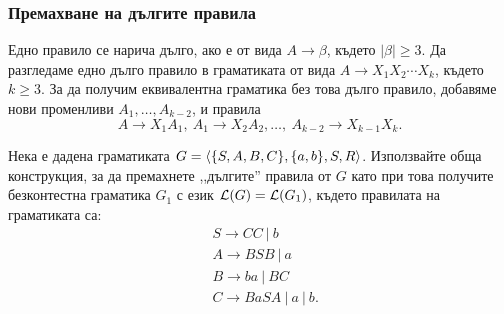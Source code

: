 \subsubsection*{Премахване на дългите правила}

Едно правило се нарича дълго, ако е от вида $A \to \beta$, където $|\beta| \geq 3$.
Да разгледаме едно дълго правило в граматиката от вида $A \to X_1X_2\cdots X_k$, 
където $k \geq 3$. За да получим еквивалентна граматика без това дълго правило,
добавяме нови променливи $A_1,\dots, A_{k-2}$, и правила
\[A \to X_1A_1,\ A_1 \to X_2A_2, \dots,\ A_{k-2} \to X_{k-1}X_k.\]


\begin{problem}
  Нека е дадена граматиката  $G = \langle{\{S,A,B,C\}, \{a,b\}, S, R}\rangle$.
  Използвайте обща конструкция, за да премахнете ,,дългите'' правила от $ G$ като при това получите 
  безконтестна граматика $G_1$ с език $\mathcal{L}(G) = \mathcal{L}(G_1)$, където правилата на граматиката са:
    \begin{align*}
      & S\to CC\ |\ b\\
      & A\to BSB\ |\ a\\
      & B\to ba\ |\ BC\\
      & C\to BaSA\ |\ a\ |\ b.
    \end{align*}
\end{problem}

